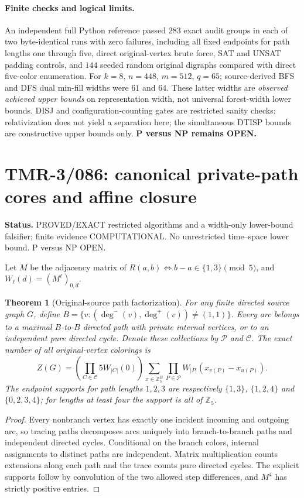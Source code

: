 \documentclass[11pt]{article}
\newtheorem{theorem}{Theorem}
\begin{document}
\paragraph{Finite checks and logical limits.}
An independent full Python reference passed $283$ exact audit
groups in each of two byte-identical runs with zero failures,
including all fixed endpoints for path lengths one through five,
direct original-vertex brute force, SAT and UNSAT padding controls,
and $144$ seeded random original digraphs compared with direct
five-color enumeration. For $k=8$, $n=448$, $m=512$, $q=65$;
source-derived BFS and DFS dual min-fill widths were $61$ and $64$.
These latter widths are \emph{observed achieved upper bounds} on
representation width, not universal forest-width lower bounds.
DISJ and configuration-counting gates are restricted sanity
checks; relativization does not yield a separation here; the
simultaneous DTISP bounds are constructive upper bounds only.
\textbf{P versus NP remains OPEN.}


\section{TMR-3/086: canonical private-path cores and affine closure}
\noindent\textbf{Status.} PROVED/EXACT restricted algorithms and
a width-only lower-bound falsifier; finite evidence COMPUTATIONAL.
No unrestricted time--space lower bound. P versus NP OPEN.

Let $M$ be the adjacency matrix of $R(a,b)\Leftrightarrow
b-a\in\{1,3\}\pmod5$, and $W_\ell(d)=(M^\ell)_{0,d}$.
\begin{theorem}[Original-source path factorization]
For any finite directed source graph $G$, define
$B=\{v:(\deg^-(v),\deg^+(v))\ne(1,1)\}$.
Every arc belongs to a maximal $B$-to-$B$ directed path with
private internal vertices, or to an independent pure directed
cycle. Denote these collections by $\mathcal P$ and $\mathcal C$.
The exact number of all original-vertex colorings is
\[
Z(G)=\left(\prod_{C\in\mathcal C}5W_{|C|}(0)\right)
\sum_{x\in\mathbb Z_5^B}\prod_{P\in\mathcal P}
W_{|P|}(x_{v(P)}-x_{u(P)}).
\]
The endpoint supports for path lengths $1,2,3$ are respectively
$\{1,3\}$, $\{1,2,4\}$ and $\{0,2,3,4\}$;
for lengths at least four the support is all of $\mathbb Z_5$.
\end{theorem}
\begin{proof}
Every nonbranch vertex has exactly one incident incoming and
outgoing arc, so tracing paths decomposes arcs uniquely into
branch-to-branch paths and independent directed cycles.
Conditional on the branch colors, internal assignments to
distinct paths are independent. Matrix multiplication counts
extensions along each path and the trace counts pure directed
cycles. The explicit supports follow by convolution of the
two allowed step differences, and $M^4$ has strictly positive
entries.
\end{proof}
\end{document}
